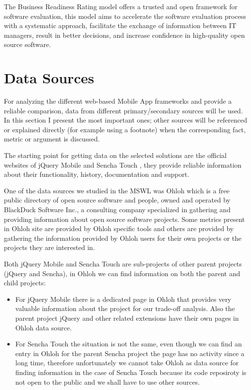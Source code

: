 \documentclass[a4paper,12pt]{book}
\begin{document}
The Business Readiness Rating model offers a trusted and open framework for software evaluation, this model aims to accelerate the software evaluation process with a systematic approach, facilitate the exchange of information between IT managers, result in better decisions, and increase confidence in high-quality open source software.

\section{Data Sources}
\label{sec:data}

For analyzing the different web-based Mobile App frameworks and provide a reliable comparison, data from different primary/secondary sources will be used. In this section I present the most important ones; other sources will be referenced or explained directly (for example using a footnote) when the corresponding fact, metric or argument is discussed.

The starting point for getting data on the selected solutions are the official websites of jQuery Mobile\cite{jquery} and Sencha Touch\cite{sencha} , they provide reliable information about their functionality, history, documentation and support. 

One of the data sources we studied in the MSWL was Ohloh\cite{Ohloh} which is a free public
directory of open source software and people, owned and operated by BlackDuck Software Inc., a consulting company specialized in gathering and providing information about open source software projects. Some metrics present in Ohloh site are provided by Ohloh specific tools and others are provided by gathering the information provided by Ohloh users for their own projects or the projects they are interested in.

Both jQuery Mobile and Sencha Touch are sub-projects of other parent projects (jQuery and Sencha), in Ohloh we can find information on both the parent and child projects:

\begin{itemize}
 \item For jQuery Mobile there is a dedicated page in Ohloh\cite{ojquery} that provides very valuable information about the project for our trade-off analysis. Also the parent project jQuery\cite{ojqueryparent} and other related extensions have their own pages in Ohloh data source.
 \item For Sencha Touch the situation is not the same, even though we can find an entry in Ohloh for the parent Sencha project\cite{osencha} the page has no activity since a long time, therefore unfortunately we cannot take Ohloh as data source for finding information in the case of Sencha Touch because its code reposiroty is not open to the public and we shall have to use other sources.
\end{itemize}
\end{document}
